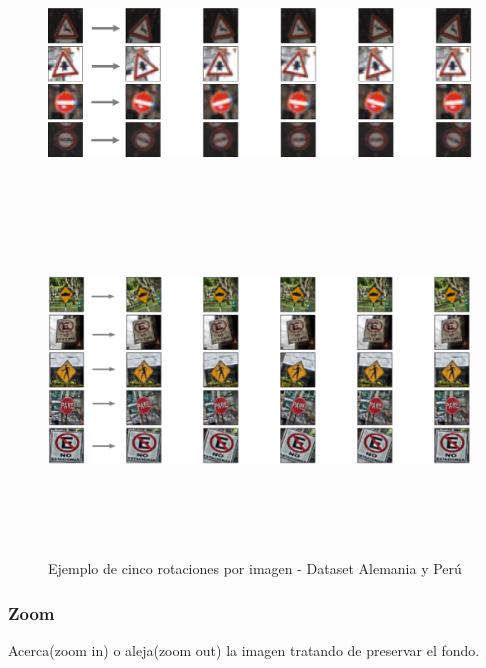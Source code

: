 	        \begin{figure}[H]
				\begin{center}
				\includegraphics[width=1\textwidth,height=6cm]{images/desarrollo/Augment/fixedrotation3}
				\includegraphics[width=1\textwidth,height=9cm]{images/desarrollo/Augment/fixedrotation2}
				\end{center}
				\begin{center}
				\caption{\small{Ejemplo de cinco rotaciones por imagen - Dataset Alemania y Perú}}
				{\small{\fontsize{10}{16.8}\selectfont {Fuente: Elaboración propia}}}
				\end{center}
				\vspace{-1.5em}
			\end{figure}
	    
		\newpage
	    \subsubsection{Zoom}
	    	Acerca(zoom in) o aleja(zoom out) la imagen  tratando de preservar el fondo.


